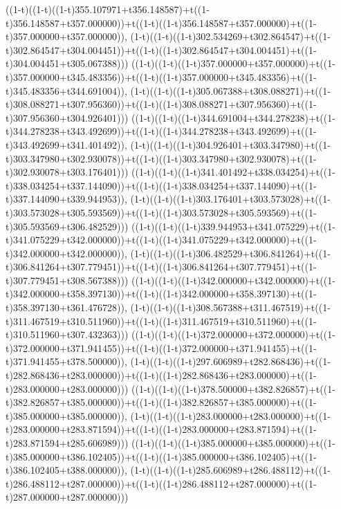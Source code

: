 ((1-t)((1-t)((1-t)355.107971+t356.148587)+t((1-t)356.148587+t357.000000))+t((1-t)((1-t)356.148587+t357.000000)+t((1-t)357.000000+t357.000000)),                                     (1-t)((1-t)((1-t)302.534269+t302.864547)+t((1-t)302.864547+t304.004451))+t((1-t)((1-t)302.864547+t304.004451)+t((1-t)304.004451+t305.067388)))
((1-t)((1-t)((1-t)357.000000+t357.000000)+t((1-t)357.000000+t345.483356))+t((1-t)((1-t)357.000000+t345.483356)+t((1-t)345.483356+t344.691004)),                                     (1-t)((1-t)((1-t)305.067388+t308.088271)+t((1-t)308.088271+t307.956360))+t((1-t)((1-t)308.088271+t307.956360)+t((1-t)307.956360+t304.926401)))
((1-t)((1-t)((1-t)344.691004+t344.278238)+t((1-t)344.278238+t343.492699))+t((1-t)((1-t)344.278238+t343.492699)+t((1-t)343.492699+t341.401492)),                                     (1-t)((1-t)((1-t)304.926401+t303.347980)+t((1-t)303.347980+t302.930078))+t((1-t)((1-t)303.347980+t302.930078)+t((1-t)302.930078+t303.176401)))
((1-t)((1-t)((1-t)341.401492+t338.034254)+t((1-t)338.034254+t337.144090))+t((1-t)((1-t)338.034254+t337.144090)+t((1-t)337.144090+t339.944953)),                                     (1-t)((1-t)((1-t)303.176401+t303.573028)+t((1-t)303.573028+t305.593569))+t((1-t)((1-t)303.573028+t305.593569)+t((1-t)305.593569+t306.482529)))
((1-t)((1-t)((1-t)339.944953+t341.075229)+t((1-t)341.075229+t342.000000))+t((1-t)((1-t)341.075229+t342.000000)+t((1-t)342.000000+t342.000000)),                                     (1-t)((1-t)((1-t)306.482529+t306.841264)+t((1-t)306.841264+t307.779451))+t((1-t)((1-t)306.841264+t307.779451)+t((1-t)307.779451+t308.567388)))
((1-t)((1-t)((1-t)342.000000+t342.000000)+t((1-t)342.000000+t358.397130))+t((1-t)((1-t)342.000000+t358.397130)+t((1-t)358.397130+t361.476728)),                                     (1-t)((1-t)((1-t)308.567388+t311.467519)+t((1-t)311.467519+t310.511960))+t((1-t)((1-t)311.467519+t310.511960)+t((1-t)310.511960+t307.432363)))
((1-t)((1-t)((1-t)372.000000+t372.000000)+t((1-t)372.000000+t371.941455))+t((1-t)((1-t)372.000000+t371.941455)+t((1-t)371.941455+t378.500000)),                                     (1-t)((1-t)((1-t)297.606989+t282.868436)+t((1-t)282.868436+t283.000000))+t((1-t)((1-t)282.868436+t283.000000)+t((1-t)283.000000+t283.000000)))
((1-t)((1-t)((1-t)378.500000+t382.826857)+t((1-t)382.826857+t385.000000))+t((1-t)((1-t)382.826857+t385.000000)+t((1-t)385.000000+t385.000000)),                                     (1-t)((1-t)((1-t)283.000000+t283.000000)+t((1-t)283.000000+t283.871594))+t((1-t)((1-t)283.000000+t283.871594)+t((1-t)283.871594+t285.606989)))
((1-t)((1-t)((1-t)385.000000+t385.000000)+t((1-t)385.000000+t386.102405))+t((1-t)((1-t)385.000000+t386.102405)+t((1-t)386.102405+t388.000000)),                                     (1-t)((1-t)((1-t)285.606989+t286.488112)+t((1-t)286.488112+t287.000000))+t((1-t)((1-t)286.488112+t287.000000)+t((1-t)287.000000+t287.000000)))
